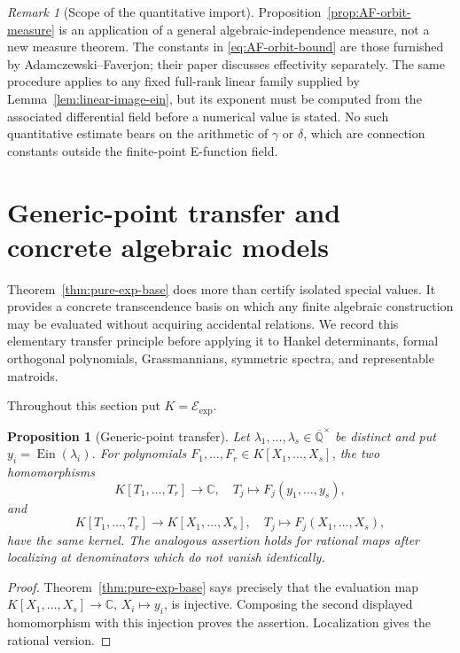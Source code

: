 \documentclass[11pt]{article}
\newtheorem{proposition}[theorem]{Proposition}
\theoremstyle{definition}
\theoremstyle{remark}
\newtheorem{remark}[theorem]{Remark}
\newcommand{\Qbar}{\overline{\mathbb Q}}
\newcommand{\C}{\mathbb C}
\newcommand{\Ein}{\operatorname{Ein}}
\newcommand{\Eexp}{\mathcal E_{\mathrm{exp}}}
\begin{document}
\begin{remark}[Scope of the quantitative import]
Proposition~\ref{prop:AF-orbit-measure} is an application of a general
algebraic-independence measure, not a new measure theorem.  The constants in
\eqref{eq:AF-orbit-bound} are those furnished by
Adamczewski--Faverjon; their paper discusses effectivity separately.  The
same procedure applies to any fixed full-rank linear family supplied by
Lemma~\ref{lem:linear-image-ein}, but its exponent must be computed from the
associated differential field before a numerical value is stated.  No such
quantitative estimate bears on the arithmetic of \(\gamma\) or \(\delta\),
which are connection constants outside the finite-point E-function field.
\end{remark}

\section{Generic-point transfer and concrete algebraic models}
\label{sec:generic-ein-applications}

Theorem~\ref{thm:pure-exp-base} does more than certify isolated special
values.  It provides a concrete transcendence basis on which any finite
algebraic construction may be evaluated without acquiring accidental
relations.  We record this elementary transfer principle before applying it
to Hankel determinants, formal orthogonal polynomials, Grassmannians,
symmetric spectra, and representable matroids.

Throughout this section put $K=\Eexp$.

\begin{proposition}[Generic-point transfer]
\label{prop:generic-point-transfer}
Let $\lambda_1,\ldots,\lambda_s\in\Qbar^\times$ be distinct and put
$y_i=\Ein(\lambda_i)$.  For polynomials
$F_1,\ldots,F_r\in K[X_1,\ldots,X_s]$, the two homomorphisms
\[
 K[T_1,\ldots,T_r]\longrightarrow\C,
 \quad T_j\longmapsto F_j(y_1,\ldots,y_s),
\]
and
\[
 K[T_1,\ldots,T_r]\longrightarrow K[X_1,\ldots,X_s],
 \quad T_j\longmapsto F_j(X_1,\ldots,X_s),
\]
have the same kernel.  The analogous assertion holds for rational maps
after localizing at denominators which do not vanish identically.
\end{proposition}

\begin{proof}
Theorem~\ref{thm:pure-exp-base} says precisely that the evaluation map
$K[X_1,\ldots,X_s]\to\C$, $X_i\mapsto y_i$, is injective.  Composing the
second displayed homomorphism with this injection proves the assertion.
Localization gives the rational version.
\end{proof}
\end{document}
